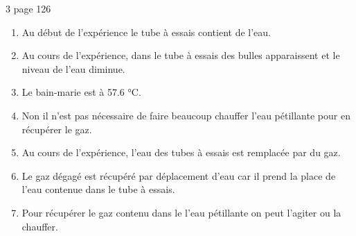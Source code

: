 \begin{myact}{3 page 126}
	\begin{enumerate}
		\item Au début de l'expérience le tube à essais contient de l'eau.\pause
		\item Au cours de l'expérience, dans le tube à essais des bulles apparaissent et le niveau de l'eau diminue.\pause
		\item Le bain-marie est à \num{57.6} °C.\pause
		\item Non il n'est pas nécessaire de faire beaucoup chauffer l'eau pétillante pour en récupérer le gaz.\pause
		\item Au cours de l'expérience, l'eau des tubes à essais est remplacée par du gaz.\pause
		\item Le gaz dégagé est récupéré par déplacement d'eau car il prend la place de l'eau contenue dans le tube à essais.\pause
		\item Pour récupérer le gaz contenu dans le l'eau pétillante on peut l'agiter  ou la chauffer.
	\end{enumerate}
\end{myact}